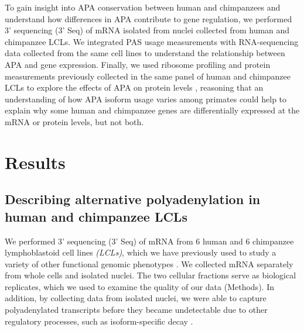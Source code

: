 To gain insight into APA conservation between human and chimpanzees and understand how differences in APA contribute to gene regulation, we performed 3' sequencing (3' Seq) of mRNA isolated from nuclei collected from human and chimpanzee LCLs. We integrated PAS usage measurements with RNA-sequencing data collected from the same cell lines to understand the relationship between APA and gene expression. Finally, we used ribosome profiling and protein measurements previously collected in the same panel of human and chimpanzee LCLs to explore the effects of APA on protein levels \citep{khan_primate_2013, wang_post-translational_2018}, reasoning that an understanding of how APA isoform usage varies among primates could help to explain why some human and chimpanzee genes are differentially expressed at the mRNA or protein levels, but not both.

\section{Results}

\subsection{Describing alternative polyadenylation in human and chimpanzee LCLs }\label{descSpec}

We performed 3' sequencing (3' Seq) of mRNA from 6 human and 6 chimpanzee lymphoblastoid cell lines \emph{(LCLs)}, which we have previously used to study a variety of other functional genomic phenotypes \citep{cain_gene_2011, khan_primate_2013, wang_post-translational_2018, zhou_epigenetic_2014}. We collected mRNA separately from whole cells and isolated nuclei. The two cellular fractions serve as biological replicates, which we used to examine the quality of our data (Methods). In addition, by collecting data from isolated nuclei, we were able to capture polyadenylated transcripts before they became undetectable due to other regulatory processes, such as isoform-specific decay \cite{mittleman_alternative_2020}.  


